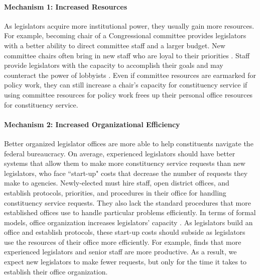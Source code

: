\documentclass[12pt]{article}
\begin{document}
\paragraph{Mechanism 1: Increased Resources} As legislators acquire more institutional power, they usually gain more resources. For example, becoming chair of a Congressional committee provides legislators with a better ability to direct committee staff and a larger budget. New committee chairs often bring in new staff who are loyal to their priorities \citep{Fox1977, DeGregorio1995}. Staff provide legislators with the capacity to accomplish their goals \citep{DeGregorio1994, Hall1996, HertelFernandez2019, MontgomeryNyhan2017, McCrain2018, CrossonEtAl2020, Reynolds2020} and may counteract the power of lobbyists \citep{HallDeardorff2006}. Even if committee resources are earmarked for policy work, they can still increase a chair's capacity for constituency service if using committee resources for policy work frees up their personal office resources for constituency service.

\paragraph{Mechanism 2: Increased Organizational Efficiency} Better organized legislator offices are more able to help constituents navigate the federal bureaucracy. On average, experienced legislators should have better systems that allow them to make more constituency service requests than new legislators, who face ``start-up" costs that decrease the number of requests they make to agencies. Newly-elected %
must hire staff, open district offices, and establish protocols, priorities, and procedures in their office for handling constituency service requests. They also lack the standard procedures that more established offices use to handle particular problems efficiently. In terms of formal models, office organization increases legislators' capacity \citep{AshworthBuenodeMesquita2006}. As legislators build an office and establish protocols, these start-up costs should subside as legislators use the resources of their office more efficiently. For example, \citet{Cottle2022} finds that more experienced legislators and senior staff are more productive. As a result, we expect new legislators to make fewer requests, but only for the time it takes to establish their office organization.   
\end{document}
